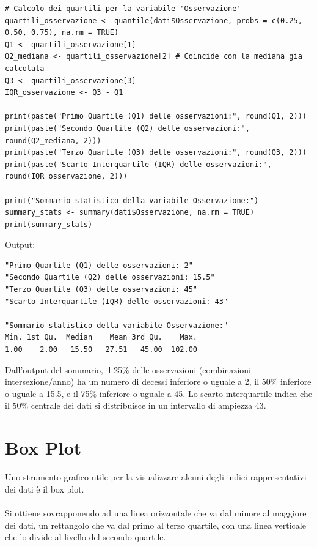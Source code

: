 \documentclass[14pt, openany, titlepage]{report} %
\begin{document}
\begin{center}
\begin{lstlisting}[breaklines=true]
# Calcolo dei quartili per la variabile 'Osservazione'
quartili_osservazione <- quantile(dati$Osservazione, probs = c(0.25, 0.50, 0.75), na.rm = TRUE)
Q1 <- quartili_osservazione[1]
Q2_mediana <- quartili_osservazione[2] # Coincide con la mediana gia calcolata
Q3 <- quartili_osservazione[3]
IQR_osservazione <- Q3 - Q1

print(paste("Primo Quartile (Q1) delle osservazioni:", round(Q1, 2)))
print(paste("Secondo Quartile (Q2) delle osservazioni:", round(Q2_mediana, 2)))
print(paste("Terzo Quartile (Q3) delle osservazioni:", round(Q3, 2)))
print(paste("Scarto Interquartile (IQR) delle osservazioni:", round(IQR_osservazione, 2)))

print("Sommario statistico della variabile Osservazione:")
summary_stats <- summary(dati$Osservazione, na.rm = TRUE)
print(summary_stats)
\end{lstlisting}
\end{center}
\noindent
Output:
\begin{verbatim}
"Primo Quartile (Q1) delle osservazioni: 2"  
"Secondo Quartile (Q2) delle osservazioni: 15.5"
"Terzo Quartile (Q3) delle osservazioni: 45"  
"Scarto Interquartile (IQR) delle osservazioni: 43"

"Sommario statistico della variabile Osservazione:"
Min. 1st Qu.  Median    Mean 3rd Qu.    Max.   
1.00    2.00   15.50   27.51   45.00  102.00   
\end{verbatim}
Dall'output del sommario, il 25\% delle osservazioni (combinazioni intersezione/anno) 
ha un numero di decessi inferiore o uguale a 2, il 50\% inferiore o uguale a
15.5, e il 75\% inferiore o uguale a 45. Lo scarto interquartile
indica che il 50\% centrale dei dati si distribuisce in un intervallo di ampiezza 
43.

\section{Box Plot}
Uno strumento grafico utile per la visualizzare alcuni degli indici 
rappresentativi dei dati è il box plot.\\\\
\noindent
Si ottiene sovrapponendo ad una linea orizzontale che va dal minore al maggiore dei dati,
un rettangolo che va dal primo al terzo quartile, con una linea verticale che lo divide
al livello del secondo quartile.
\end{document}
